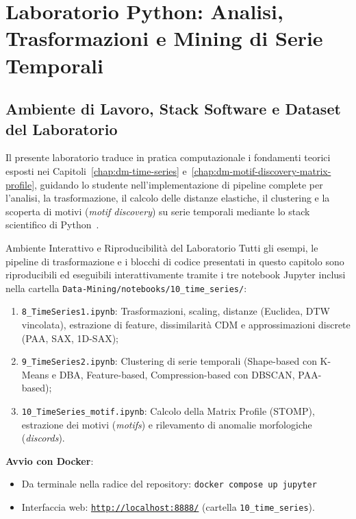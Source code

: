 \chapter{Laboratorio Python: Analisi, Trasformazioni e Mining di Serie Temporali}
\label{chap:dm-python-lab-time-series}

\FloatBarrier
\section{Ambiente di Lavoro, Stack Software e Dataset del Laboratorio}
\label{sec:ts-lab-environment}

Il presente laboratorio traduce in pratica computazionale i fondamenti teorici esposti nei Capitoli~\ref{chap:dm-time-series} e~\ref{chap:dm-motif-discovery-matrix-profile}, guidando lo studente nell'implementazione di pipeline complete per l'analisi, la trasformazione, il calcolo delle distanze elastiche, il clustering e la scoperta di motivi (\textit{motif discovery}) su serie temporali mediante lo stack scientifico di Python~\cite{tan2018}.

\begin{noteblock}{Ambiente Interattivo e Riproducibilit\`a del Laboratorio}
Tutti gli esempi, le pipeline di trasformazione e i blocchi di codice presentati in questo capitolo sono riproducibili ed eseguibili interattivamente tramite i tre notebook Jupyter inclusi nella cartella \texttt{Data-Mining/notebooks/10\_time\_series/}:
\begin{enumerate}[noitemsep]
    \item \texttt{8\_TimeSeries1.ipynb}: Trasformazioni, scaling, distanze (Euclidea, DTW vincolata), estrazione di feature, dissimilarit\`a CDM e approssimazioni discrete (PAA, SAX, 1D-SAX);
    \item \texttt{9\_TimeSeries2.ipynb}: Clustering di serie temporali (Shape-based con K-Means e DBA, Feature-based, Compression-based con DBSCAN, PAA-based);
    \item \texttt{10\_TimeSeries\_motif.ipynb}: Calcolo della Matrix Profile (STOMP), estrazione dei motivi (\textit{motifs}) e rilevamento di anomalie morfologiche (\textit{discords}).
\end{enumerate}

\textbf{Avvio con Docker}:
\begin{itemize}[noitemsep]
    \item Da terminale nella radice del repository: \texttt{docker compose up jupyter}
    \item Interfaccia web: \href{http://localhost:8888/lab/tree/notebooks/10_time_series/}{\texttt{http://localhost:8888/}} (cartella \texttt{10\_time\_series}).
\end{itemize}
\end{noteblock}

